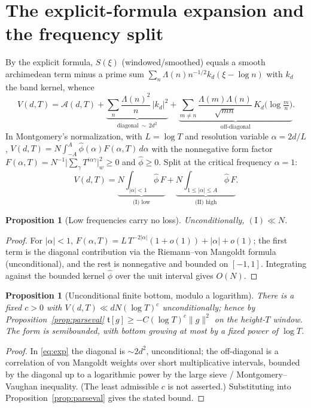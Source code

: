\documentclass[11pt]{amsart}
\newtheorem{proposition}[theorem]{Proposition}
\theoremstyle{definition}
\theoremstyle{remark}
\newcommand{\ft}{\mathfrak t}
\begin{document}
\section{The explicit-formula expansion and the frequency split}
By the explicit formula, $S(\xi)$ (windowed/smoothed) equals a smooth
archimedean term minus a prime sum $\sum_n\Lambda(n)n^{-1/2}k_d(\xi-\log n)$ with
$k_d$ the band kernel, whence
\begin{equation}\label{eq:exp}
V(d,T)=\mathcal A(d,T)+\underbrace{\sum_{n}\frac{\Lambda(n)^2}{n}\,|k_d|^2}_{\text{diagonal}\ \sim\,2d^2}
+\underbrace{\sum_{m\ne n}\frac{\Lambda(m)\Lambda(n)}{\sqrt{mn}}\,K_d\!\bigl(\log\tfrac mn\bigr)}_{\text{off-diagonal}} .
\end{equation}
In Montgomery's normalization, with $L=\log T$ and resolution variable
$\alpha=2d/L$, $V(d,T)=N\int_{-A}^{A}\widehat\phi(\alpha)F(\alpha,T)\,d\alpha$
with the nonnegative form factor $F(\alpha,T)=N^{-1}\bigl|\sum_\gamma
T^{i\alpha\gamma}\bigr|^2_w\ge0$ and $\widehat\phi\ge0$. Split at the critical
frequency $\alpha=1$:
\[
V(d,T)=\underbrace{N\!\int_{|\alpha|<1}\widehat\phi\,F}_{\text{(I) low}}
+\underbrace{N\!\int_{1\le|\alpha|\le A}\widehat\phi\,F}_{\text{(II) high}} .
\]

\begin{proposition}[Low frequencies carry no loss]\label{prop:low}
Unconditionally, $\mathrm{(I)}\ll N$.
\end{proposition}
\begin{proof}
For $|\alpha|<1$, $F(\alpha,T)=L\,T^{-2|\alpha|}(1+o(1))+|\alpha|+o(1)$; the first
term is the diagonal contribution via the Riemann--von Mangoldt formula
(unconditional), and the rest is nonnegative and bounded on $[-1,1]$. Integrating
against the bounded kernel $\widehat\phi$ over the unit interval gives $O(N)$.
\end{proof}

\begin{proposition}[Unconditional finite bottom, modulo a logarithm]\label{prop:S}
There is a fixed $c>0$ with $V(d,T)\ll dN(\log T)^c$ unconditionally; hence by
Proposition~\ref{prop:parseval} $\ft[g]\ge-C(\log T)^c\|g\|^2$ on the
height-$T$ window. The form is semibounded, with bottom growing at most by a fixed
power of $\log T$.
\end{proposition}
\begin{proof}
In \eqref{eq:exp} the diagonal is $\sim2d^2$, unconditional; the off-diagonal is a
correlation of von Mangoldt weights over short multiplicative intervals, bounded
by the diagonal up to a logarithmic power by the large sieve / Montgomery--Vaughan
inequality. (The least admissible $c$ is not asserted.) Substituting into
Proposition~\ref{prop:parseval} gives the stated bound.
\end{proof}
\end{document}
